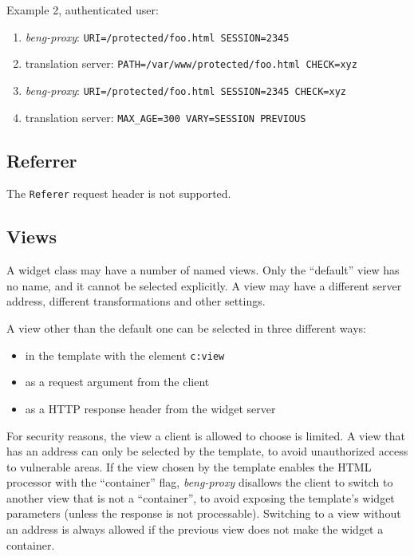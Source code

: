 \documentclass[a4paper,12pt]{article}
\begin{document}
Example 2, authenticated user:

\begin{enumerate}
\item \emph{beng-proxy}: \texttt{URI=/protected/foo.html SESSION=2345}
\item translation server: \texttt{PATH=/var/www/protected/foo.html
  CHECK=xyz}
\item \emph{beng-proxy}: \texttt{URI=/protected/foo.html SESSION=2345
  CHECK=xyz}
\item translation server: \texttt{MAX\_AGE=300 VARY=SESSION PREVIOUS}
\end{enumerate}


\subsection{Referrer}

The \texttt{Referer} request header is not supported.

\subsection{Views}

A widget class may have a number of named views.  Only the ``default''
view has no name, and it cannot be selected explicitly.  A view may
have a different server address, different transformations and other
settings.

A view other than the default one can be selected in three different
ways:

\begin{itemize}
\item in the template with the element \texttt{c:view}
\item as a request argument from the client
\item as a HTTP response header from the widget server
\end{itemize}

For security reasons, the view a client is allowed to choose is
limited.  A view that has an address can only be selected by the
template, to avoid unauthorized access to vulnerable areas.  If the
view chosen by the template enables the HTML processor with the
``container'' flag, \emph{beng-proxy} disallows the client to switch
to another view that is not a ``container'', to avoid exposing the
template's widget parameters (unless the response is not processable).
Switching to a view without an address is always allowed if the
previous view does not make the widget a container.
\end{document}
